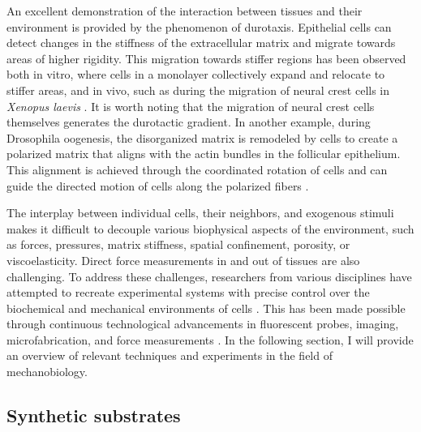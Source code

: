 An excellent demonstration of the interaction between tissues and their environment is provided by the phenomenon of durotaxis. Epithelial cells can detect changes in the stiffness of the extracellular matrix and migrate towards areas of higher rigidity. This migration towards stiffer regions has been observed both in vitro, where cells in a monolayer collectively expand and relocate to stiffer areas, and in vivo, such as during the migration of neural crest cells in \textit{Xenopus laevis} \cite{sunyer2016, shellard2021}. It is worth noting that the migration of neural crest cells themselves generates the durotactic gradient. In another example, during Drosophila oogenesis, the disorganized matrix is remodeled by cells to create a polarized matrix that aligns with the actin bundles in the follicular epithelium. This alignment is achieved through the coordinated rotation of cells and can guide the directed motion of cells along the polarized fibers \cite{haigo2011, cetera2014}.

The interplay between individual cells, their neighbors, and exogenous stimuli makes it difficult to decouple various biophysical aspects of the environment, such as forces, pressures, matrix stiffness, spatial confinement, porosity, or viscoelasticity. Direct force measurements in and out of tissues are also challenging. To address these challenges, researchers from various disciplines have attempted to recreate experimental systems with precise control over the biochemical and mechanical environments of cells \cite{xi2018}. This has been made possible through continuous technological advancements in fluorescent probes, imaging, microfabrication, and force measurements \cite{roca-cusachs2017}. In the following section, I will provide an overview of relevant techniques and experiments in the field of mechanobiology.

\hypertarget{synthetic-substrates}{%
\subsection{Synthetic substrates}\label{synthetic-substrates}}

